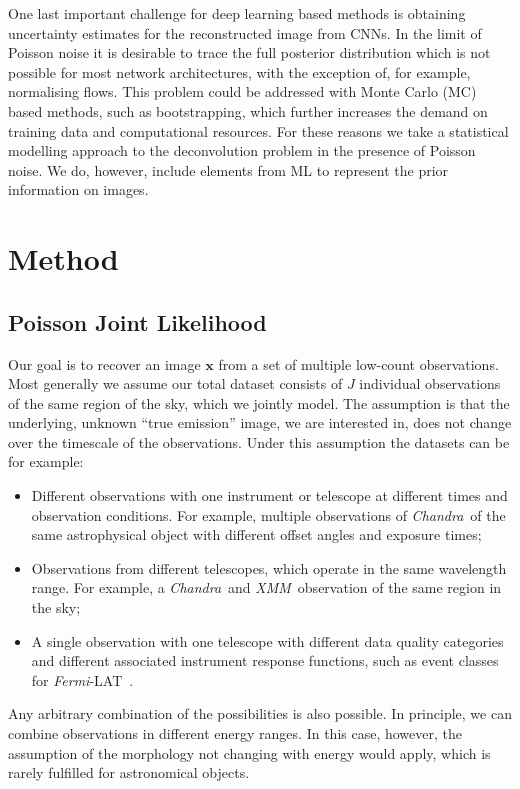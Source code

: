 \documentclass[twocolumn, lineno]{aastex631}
\newcommand{\chandra}{\textit{Chandra}~}
\newcommand{\xmm}{\textit{XMM}~}
\newcommand{\fermi}{\textit{Fermi}-LAT~}
\begin{document}
    One last important challenge for deep learning based methods is obtaining uncertainty estimates for the reconstructed image from CNNs. In the limit of Poisson noise it is desirable to trace the full posterior distribution
    which is not possible for most network architectures, with the exception of, for example, normalising flows. This problem could be addressed with Monte Carlo (MC) based methods, such as bootstrapping, which further increases the demand on training data and computational resources. For these reasons we take a statistical modelling approach to the deconvolution problem in the presence of Poisson noise. We do, however, include elements from ML to represent the prior information on images.

    \section{Method}
    
    \subsection{Poisson Joint Likelihood}
    Our goal is to recover an image $\mathbf{x}$ from a set of multiple low-count observations. Most generally we assume our total dataset consists of $J$ individual observations of the same region of the sky, which we jointly model. The assumption is that the underlying, unknown \enquote{true emission} image, we are interested in, does not change over the timescale of the observations. Under this assumption the datasets can be for example:

    \begin{itemize}
        \item Different observations with one instrument or telescope at different times and observation conditions. For example, multiple observations of \chandra of the same astrophysical object with different offset angles and exposure times;
        \item Observations from different telescopes, which operate in the same wavelength range. For example, a \chandra and \xmm observation of the same region in the sky;
        \item A single observation with one telescope with different data quality categories and different associated instrument response functions, such as event classes for \fermi.
    \end{itemize}

    Any arbitrary combination of the possibilities is also possible.
    In principle, we can combine observations in different energy ranges. In this case, however, the assumption of the morphology not changing with energy would apply, which is rarely fulfilled for astronomical objects.
    
\end{document}
